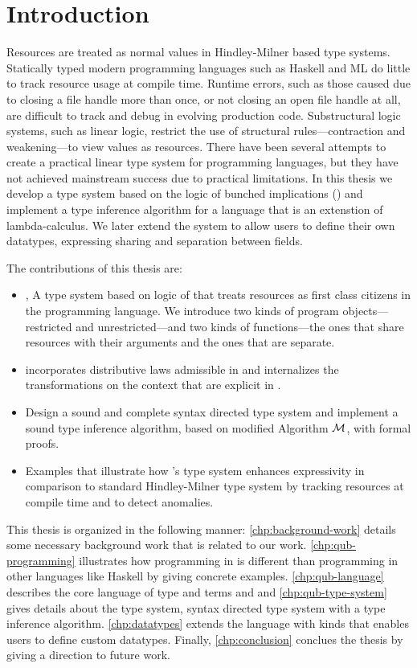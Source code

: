 \chapter{Introduction}\label{chp:intro}

Resources are treated as normal values in Hindley-Milner based type systems. Statically typed modern programming languages such as
Haskell and ML  do little to track resource usage at compile time. Runtime errors, such as those caused due to closing a file handle
more than once, or not closing an open file handle at all, are difficult to track and debug in evolving production code.
Substructural logic systems, such as linear logic, restrict the use of structural rules---contraction and weakening---to view values as resources.
There have been several attempts to create a practical linear type system for programming languages, but they have not achieved mainstream
success due to practical limitations. In this thesis we develop a type system based on the logic of bunched implications (\BI{})
and implement a type inference algorithm for a language that is an extenstion of lambda-calculus. We later extend the system to allow users to define
their own datatypes, expressing sharing and separation between fields.

The contributions of this thesis are:
\begin{itemize}
\item \qub{}, A type system based on logic of \BI{} that treats resources as first class citizens in the programming language.
  We introduce two kinds of program objects---restricted and unrestricted---and two kinds of functions---the ones that share resources with
  their arguments and the ones that are separate.
\item \qub{} incorporates distributive laws admissible in \BI{} and internalizes the transformations on the context that are explicit in \BI{}.
\item Design a sound and complete syntax directed type system and implement a sound type inference algorithm, based on modified Algorithm $\mathcal{M}$, with
  formal proofs.
\item Examples that illustrate how \qub{}'s type system enhances expressivity in comparison to standard Hindley-Milner type system by
  tracking resources at compile time and to detect anomalies.
\end{itemize}

This thesis is organized in the following manner: \cref{chp:background-work} details some necessary background work that is related to our work.
\cref{chp:qub-programming} illustrates how programming in \qub{} is different than programming in other languages like Haskell by giving concrete examples.
\cref{chp:qub-language} describes the core language of type and terms and and \cref{chp:qub-type-system} gives details about the type system,
syntax directed type system with a type inference algorithm. \cref{chp:datatypes} extends the language with kinds that enables users to define
custom datatypes. Finally, \cref{chp:conclusion} conclues the thesis by giving a direction to future work.
